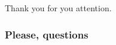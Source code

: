 \documentclass[
	11pt, %
]{beamer}
\begin{document}
%
%
%	
%	
%	
%
%
%



\begin{frame}[plain] %
	\begin{center}
		{\Huge Thank you for you attention.}
		
		\bigskip 
		
		\titlepage		
	\end{center}
\end{frame}


\begin{frame}
	\frametitle{\Huge Please, questions} %
	
	\tableofcontents %
\end{frame}



\end{document}
